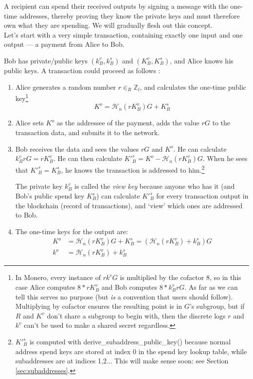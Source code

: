 A recipient can spend their received outputs by signing a message with the one-time addresses, thereby proving they know the private keys and must therefore own what they are spending. We will gradually flesh out this concept.
\\

Let’s start with a very simple transaction, containing exactly one input and one output --- a payment from Alice to Bob.

Bob has private/public keys $(k_B^v, k_B^s)$ and $(K_B^v, K_B^s)$, and Alice knows his public keys. A transaction could proceed as follows \cite{cryptoNoteWhitePaper}:


\begin{enumerate}
	\item Alice generates a random number $r \in_R \mathbb{Z}_l$, and calculates the one-time public key\footnote{In Monero, every instance of $r k^v G$ is multiplied by the cofactor 8, so in this case Alice computes $8*r K^v_B$ and Bob computes $8*k^v_B r G$. As far as we can tell this serves no purpose (but {\em is} a convention that users should follow). Multiplying by cofactor ensures the resulting point is in $G$'s subgroup, but if $R$ and $K^v$ don't share a subgroup to begin with, then the discrete logs $r$ and $k^v$ can't be used to make a shared secret regardless.}\vspace{.2cm}
	\[ K^o  = \mathcal{H}_n(r K_B^v)G + K_B^s \]

	\item Alice sets $K^o$ as the addressee of the payment, adds the value $r G$ to the transaction data, and submits it to the network.
	
	\item 	Bob receives the data and sees the values $r G$ and $K^o$. He can calculate $k_B^v r G = r K_B^v$. He can then calculate $K'^s_B = K^o - \mathcal{H}_n(r K_B^v)G$. When he sees that $K'^s_B = K_B^s$, he knows the transaction is addressed to him.\footnote{$K'^s_B $ is computed with derive\_subaddress\_public\_key() because normal address spend keys are stored at index 0 in the spend key lookup table, while subaddresses are at indices 1,2... This will make sense soon: see Section \ref{sec:subaddresses}.}
	
	The private key $k_B^v$ is called the {\em view key} because anyone who has it (and Bob’s public spend key $K_B^s$) can calculate $K'^s_B$ for every transaction output in the blockchain (record of transactions), and ‘view’ which ones are addressed to Bob.
	
	\item The one-time keys for the output are:\vspace{.2cm}
	\begin{align*}
		K^o &= \mathcal{H}_n(r K_B^v)G + K_B^s = (\mathcal{H}_n(r K_B^v) + k_B^s)G  \\ 
		k^o &= \mathcal{H}_n(r K_B^v) + k_B^s
	\end{align*}
\end{enumerate}

